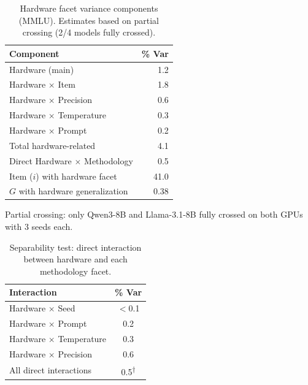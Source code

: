 \documentclass[11pt]{article}
\newcommand{\gcoeff}{G}
\begin{document}
\begin{table}[t]
\centering
\caption{Hardware facet variance components (MMLU). Estimates based on partial crossing (2/4 models fully crossed).}
\label{tab:hardware}
\begin{threeparttable}
\begin{tabular}{lr}
\toprule
\textbf{Component} & \textbf{\% Var} \\
\midrule
Hardware (main) & 1.2 \\
Hardware $\times$ Item & 1.8 \\
Hardware $\times$ Precision & 0.6 \\
Hardware $\times$ Temperature & 0.3 \\
Hardware $\times$ Prompt & 0.2 \\
\midrule
Total hardware-related & 4.1 \\
Direct Hardware $\times$ Methodology & 0.5 \\
\midrule
Item ($i$) with hardware facet & 41.0 \\
$\gcoeff$ with hardware generalization & 0.38 \\
\bottomrule
\end{tabular}
\begin{tablenotes}
\small
\item Partial crossing: only Qwen3-8B and Llama-3.1-8B fully crossed on both GPUs with 3 seeds each.
\end{tablenotes}
\end{threeparttable}
\end{table}

\begin{table}[t]
\centering
\caption{Separability test: direct interaction between hardware and each methodology facet.}
\label{tab:separability_hardware}
\begin{tabular}{lc}
\toprule
\textbf{Interaction} & \textbf{\% Var} \\
\midrule
Hardware $\times$ Seed & $<$0.1 \\
Hardware $\times$ Prompt & 0.2 \\
Hardware $\times$ Temperature & 0.3 \\
Hardware $\times$ Precision & 0.6 \\
\midrule
All direct interactions & 0.5\textsuperscript{$\dagger$} \\
\bottomrule
\end{tabular}
\end{table}

\end{document}
